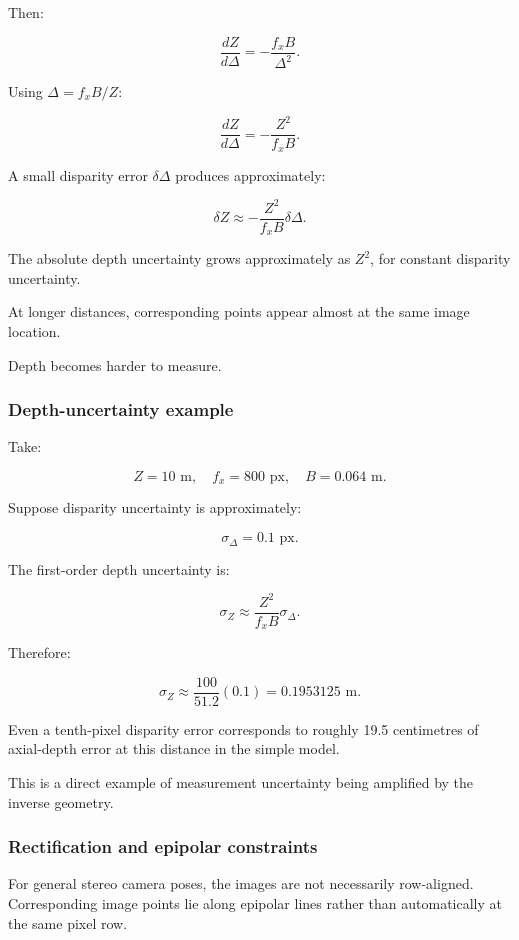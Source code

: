 Then:

\[ \frac{dZ}{d\Delta} = -\frac{f_xB}{\Delta^2}. \]

Using \(\Delta=f_xB/Z\):

\[ \boxed{ \frac{dZ}{d\Delta} = -\frac{Z^2}{f_xB}. } \]

A small disparity error \(\delta\Delta\) produces approximately:

\[ \boxed{ \delta Z\approx -\frac{Z^2}{f_xB}\delta\Delta. } \]

The absolute depth uncertainty grows approximately as \(Z^2\), for constant disparity uncertainty.

At longer distances, corresponding points appear almost at the same image location.

Depth becomes harder to measure.

\subsubsection{Depth-uncertainty example}\label{depth-uncertainty-example}

Take:

\[ Z=10\text{ m},\quad f_x=800\text{ px},\quad B=0.064\text{ m}. \]

Suppose disparity uncertainty is approximately:

\[ \sigma_\Delta=0.1\text{ px}. \]

The first-order depth uncertainty is:

\[ \sigma_Z\approx \frac{Z^2}{f_xB}\sigma_\Delta. \]

Therefore:

\[ \sigma_Z\approx \frac{100}{51.2}(0.1) =\boxed{0.1953125\text{ m}}. \]

Even a tenth-pixel disparity error corresponds to roughly 19.5 centimetres of axial-depth error at this distance in the simple model.

This is a direct example of measurement uncertainty being amplified by the inverse geometry.

\subsubsection{Rectification and epipolar constraints}\label{rectification-and-epipolar-constraints}

For general stereo camera poses, the images are not necessarily row-aligned. Corresponding image points lie along epipolar lines rather than automatically at the same pixel row.

